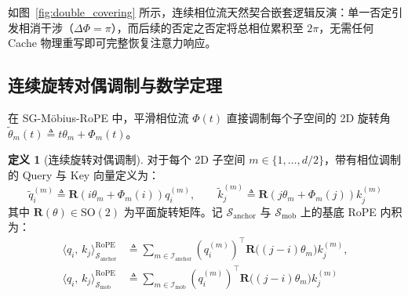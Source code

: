 \documentclass[11pt,a4paper]{article}
\theoremstyle{definition}
\newtheorem{definition}{定义}
\begin{document}
如图~\ref{fig:double_covering} 所示，连续相位流天然契合嵌套逻辑反演：单一否定引发相消干涉（$\Delta\Phi = \pi$），而后续的否定之否定将总相位累积至 $2\pi$，无需任何 Cache 物理重写即可完整恢复注意力响应。

\subsection{连续旋转对偶调制与数学定理}
在 SG-M\"obius-RoPE 中，平滑相位流 $\Phi(t)$ 直接调制每个子空间的 2D 旋转角 $\tilde{\theta}_m(t) \triangleq t\theta_m + \Phi_m(t)$。

\begin{definition}[连续旋转对偶调制]
对于每个 2D 子空间 $m \in \{1, \dots, d/2\}$，带有相位调制的 Query 与 Key 向量定义为：
\begin{equation}
\tilde{q}_i^{(m)} \triangleq \mathbf{R}(i\theta_m + \Phi_m(i)) q_i^{(m)}, \qquad \tilde{k}_j^{(m)} \triangleq \mathbf{R}(j\theta_m + \Phi_m(j)) k_j^{(m)}
\end{equation}
其中 $\mathbf{R}(\theta) \in \mathrm{SO}(2)$ 为平面旋转矩阵。记 $\mathcal{S}_{\text{anchor}}$ 与 $\mathcal{S}_{\text{mob}}$ 上的基底 RoPE 内积为：
\begin{align}
\langle q_i, \, k_j \rangle_{\mathcal{S}_{\text{anchor}}}^{\mathrm{RoPE}} &\triangleq \sum_{m \in \mathcal{I}_{\text{anchor}}} (q_i^{(m)})^\top \mathbf{R}\big((j - i)\theta_m\big) k_j^{(m)}, \\
\langle q_i, \, k_j \rangle_{\mathcal{S}_{\text{mob}}}^{\mathrm{RoPE}} &\triangleq \sum_{m \in \mathcal{I}_{\text{mob}}} (q_i^{(m)})^\top \mathbf{R}\big((j - i)\theta_m\big) k_j^{(m)}
\end{align}
\end{definition}
\end{document}
